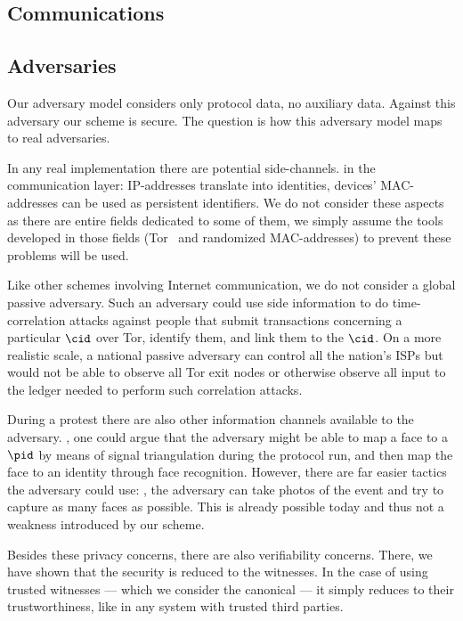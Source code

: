 \subsection{Communications}




\subsection{Adversaries}

Our adversary model considers only protocol data, no auxiliary data.
Against this adversary our scheme is secure.
The question is how this adversary model maps to real adversaries.

In any real implementation there are potential side-channels.  \Eg in
the communication layer: IP-addresses translate into identities,
devices' MAC-addresses can be used as persistent identifiers.  We do
not consider these aspects as there are entire fields dedicated to
some of them, we simply assume the tools developed in those fields
(\eg Tor~\cite{Tor} and randomized MAC-addresses) to prevent these
problems will be used.

Like other schemes involving Internet communication, we do not
consider a global passive adversary.  Such an adversary could use side
information to do \eg time-correlation attacks against people that
submit transactions concerning a particular \(\cid\) over Tor,
identify them, and link them to the \(\cid\). On a more realistic
scale, a national passive adversary can control all the nation's
\acp{ISP} but would not be able to observe all Tor exit nodes or
otherwise observe all input to the ledger needed to perform such
correlation attacks.

During a protest there are also other information channels available
to the adversary.  \Eg, one could argue that the adversary might be
able to map a face to a \(\pid\) by means of signal triangulation
during the protocol run, and then map the face to an identity through
face recognition. However, there are far easier tactics the adversary
could use: \eg, the adversary can take photos of the event and try to
capture as many faces as possible.  This is already possible today and
thus not a weakness introduced by our scheme.

Besides these privacy concerns, there are also verifiability
concerns. There, we have shown that the security is reduced to the
witnesses. In the case of using trusted witnesses --- which we
consider the canonical \CROCUS --- it simply reduces to their
trustworthiness, like in any system with trusted third parties.


